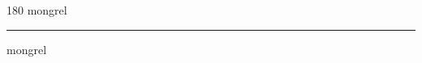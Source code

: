 
\begin{frame}
\begin{center}
\begin{turn}{180}
{\fontsize{2.5cm}{1em}\selectfont mongrel}
\end{turn}
\vspace{1em}\par  
\hrule
\vspace{1em}\par  
{\fontsize{2.5cm}{1em}\selectfont mongrel}
\end{center}
\end{frame}
